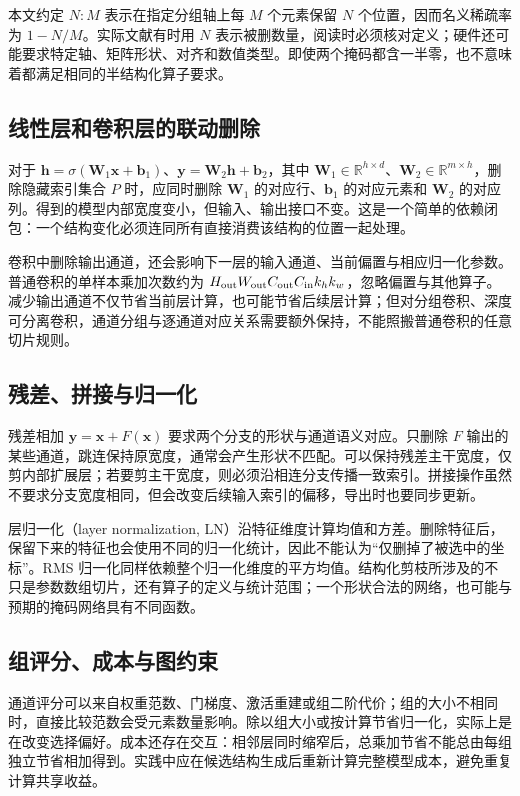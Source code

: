\documentclass[UTF8,12pt,a4paper,fontset=fandol]{ctexart}
\begin{document}
本文约定 $N{:}M$ 表示在指定分组轴上每 $M$ 个元素保留 $N$ 个位置，因而名义稀疏率为 $1-N/M$。实际文献有时用 $N$ 表示被删数量，阅读时必须核对定义；硬件还可能要求特定轴、矩阵形状、对齐和数值类型。即使两个掩码都含一半零，也不意味着都满足相同的半结构化算子要求。

\subsection{线性层和卷积层的联动删除}
对于 $\mathbf h=\sigma(\mathbf W_1\mathbf x+\mathbf b_1)$、$\mathbf y=\mathbf W_2\mathbf h+\mathbf b_2$，其中 $\mathbf W_1\in\mathbb R^{h\times d}$、$\mathbf W_2\in\mathbb R^{m\times h}$，删除隐藏索引集合 $P$ 时，应同时删除 $\mathbf W_1$ 的对应行、$\mathbf b_1$ 的对应元素和 $\mathbf W_2$ 的对应列。得到的模型内部宽度变小，但输入、输出接口不变。这是一个简单的依赖闭包：一个结构变化必须连同所有直接消费该结构的位置一起处理。

卷积中删除输出通道，还会影响下一层的输入通道、当前偏置与相应归一化参数。普通卷积的单样本乘加次数约为 $H_{\rm out}W_{\rm out}C_{\rm out}C_{\rm in}k_hk_w$，忽略偏置与其他算子。减少输出通道不仅节省当前层计算，也可能节省后续层计算；但对分组卷积、深度可分离卷积，通道分组与逐通道对应关系需要额外保持，不能照搬普通卷积的任意切片规则。

\subsection{残差、拼接与归一化}
残差相加 $\mathbf y=\mathbf x+F(\mathbf x)$ 要求两个分支的形状与通道语义对应。只删除 $F$ 输出的某些通道，跳连保持原宽度，通常会产生形状不匹配。可以保持残差主干宽度，仅剪内部扩展层；若要剪主干宽度，则必须沿相连分支传播一致索引。拼接操作虽然不要求分支宽度相同，但会改变后续输入索引的偏移，导出时也要同步更新。

层归一化（layer normalization, LN）沿特征维度计算均值和方差。删除特征后，保留下来的特征也会使用不同的归一化统计，因此不能认为“仅删掉了被选中的坐标”。RMS 归一化同样依赖整个归一化维度的平方均值。结构化剪枝所涉及的不只是参数数组切片，还有算子的定义与统计范围；一个形状合法的网络，也可能与预期的掩码网络具有不同函数。

\subsection{组评分、成本与图约束}
通道评分可以来自权重范数、门梯度、激活重建或组二阶代价；组的大小不相同时，直接比较范数会受元素数量影响。除以组大小或按计算节省归一化，实际上是在改变选择偏好。成本还存在交互：相邻层同时缩窄后，总乘加节省不能总由每组独立节省相加得到。实践中应在候选结构生成后重新计算完整模型成本，避免重复计算共享收益。
\end{document}
